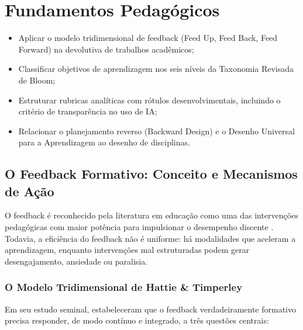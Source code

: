 \chapter{Fundamentos Pedag{\'o}gicos}
\label{cap:fundamentos}

\begin{objetivos}
\begin{itemize}
  \item Aplicar o modelo tridimensional de feedback (Feed Up, Feed Back, Feed Forward) na devolutiva de trabalhos acad{\^e}micos;
  \item Classificar objetivos de aprendizagem nos seis n{\'i}veis da Taxonomia Revisada de Bloom;
  \item Estruturar rubricas anal{\'i}ticas com r{\'o}tulos desenvolvimentais, incluindo o crit{\'e}rio de transpar{\^e}ncia no uso de IA;
  \item Relacionar o planejamento reverso (Backward Design) e o Desenho Universal para a Aprendizagem ao desenho de disciplinas.
\end{itemize}
\end{objetivos}

\section{O Feedback Formativo: Conceito e Mecanismos de A{\c c}{\~a}o}

O feedback {\'e} reconhecido pela literatura em educa{\c c}{\~a}o como uma das interven{\c c}{\~o}es pedag{\'o}gicas com maior pot{\^e}ncia para impulsionar o desempenho discente \cite{hattie2007power}. Todavia, a efici{\^e}ncia do feedback n{\~a}o {\'e} uniforme: h{\'a} modalidades que aceleram a aprendizagem, enquanto interven{\c c}{\~o}es mal estruturadas podem gerar desengajamento, ansiedade ou paralisia.

\subsection{O Modelo Tridimensional de Hattie \& Timperley}

Em seu estudo seminal,  estabeleceram que o feedback verdadeiramente formativo precisa responder, de modo cont{\'i}nuo e integrado, a tr{\^e}s quest{\~o}es centrais:

